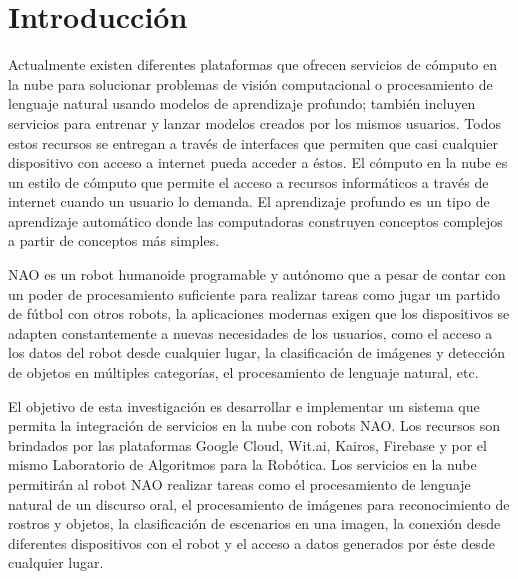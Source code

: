 

\chapter*{Introducción}
\label{\detokenize{introduction:cloudnao-una-arquitectura-de-software-para-la-integracion-de-computo-en-la-nube-con-robots-nao}}\label{\detokenize{introduction:introduccion}}\label{\detokenize{introduction::doc}}
%
Actualmente existen diferentes plataformas que 
ofrecen servicios
de cómputo en la nube para solucionar problemas de 
visión computacional o
procesamiento de lenguaje natural usando modelos
de aprendizaje profundo; también incluyen servicios 
para entrenar y lanzar
modelos creados por los mismos usuarios.
Todos estos recursos se entregan a través de 
interfaces que
permiten que casi cualquier dispositivo con acceso a 
internet
pueda acceder a éstos.
El cómputo en la nube es un estilo de cómputo que 
permite el acceso a 
recursos informáticos a través de internet cuando un
usuario lo demanda. El aprendizaje profundo es un 
tipo
de aprendizaje automático donde las computadoras 
construyen
conceptos complejos a partir de conceptos más 
simples.



NAO es un robot humanoide programable y autónomo
que a pesar de contar con
un poder de procesamiento suficiente para realizar 
tareas como
jugar un partido de fútbol con otros robots,
la aplicaciones modernas
exigen que los dispositivos se adapten constantemente a nuevas necesidades
de los usuarios, como el acceso a los datos
del robot desde cualquier lugar, la 
clasificación de imágenes y detección de
objetos en múltiples categorías, el 
procesamiento de lenguaje natural, etc.



El objetivo de esta investigación es desarrollar e implementar un sistema
que permita la integración de servicios en la nube
con robots NAO.
Los recursos son brindados por las plataformas
Google Cloud, Wit.ai, Kairos, Firebase y por
el mismo Laboratorio de Algoritmos para la
Robótica.
Los servicios en la nube permitirán al robot NAO
realizar tareas como el procesamiento de lenguaje
natural de un discurso oral, el procesamiento 
de imágenes para reconocimiento de rostros
y objetos, la clasificación de escenarios en una
imagen, la conexión desde diferentes dispositivos
con el robot y el acceso a datos generados por
éste desde cualquier lugar.


